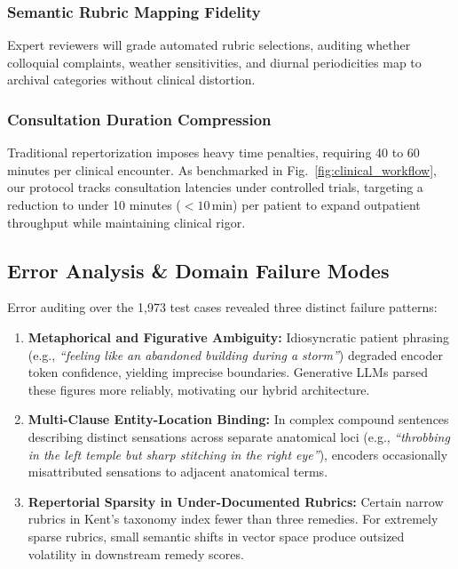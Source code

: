 \subsubsection{Semantic Rubric Mapping Fidelity}
Expert reviewers will grade automated rubric selections, auditing whether colloquial complaints, weather sensitivities, and diurnal periodicities map to archival categories without clinical distortion.

\subsubsection{Consultation Duration Compression}
Traditional repertorization imposes heavy time penalties, requiring 40 to 60 minutes per clinical encounter. As benchmarked in Fig.~\ref{fig:clinical_workflow}, our protocol tracks consultation latencies under controlled trials, targeting a reduction to under 10 minutes ($<10$\,min) per patient to expand outpatient throughput while maintaining clinical rigor.

\subsection{Error Analysis \& Domain Failure Modes}

Error auditing over the 1,973 test cases revealed three distinct failure patterns:

\begin{enumerate}
    \item \textbf{Metaphorical and Figurative Ambiguity:} Idiosyncratic patient phrasing (e.g., \textit{``feeling like an abandoned building during a storm''}) degraded encoder token confidence, yielding imprecise boundaries. Generative LLMs parsed these figures more reliably, motivating our hybrid architecture.
    \item \textbf{Multi-Clause Entity-Location Binding:} In complex compound sentences describing distinct sensations across separate anatomical loci (e.g., \textit{``throbbing in the left temple but sharp stitching in the right eye''}), encoders occasionally misattributed sensations to adjacent anatomical terms.
    \item \textbf{Repertorial Sparsity in Under-Documented Rubrics:} Certain narrow rubrics in Kent's taxonomy index fewer than three remedies. For extremely sparse rubrics, small semantic shifts in vector space produce outsized volatility in downstream remedy scores.
\end{enumerate}

